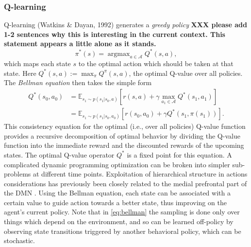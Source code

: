 \documentclass[10pt,letterpaper]{article}
\DeclareMathOperator{\argmax}{argmax}
\begin{document}
\subsubsection{Q-learning} Q-learning (Watkins \& Dayan, 1992) generates a
\textit{greedy policy}
\textbf{XXX please add 1-2 sentences why this is interesting in the current
context. This statement appears a little alone as it stands.}
\begin{equation}
  \pi^*(s) = \argmax_{a \in \mathcal A}{Q}^*(s, a),
  \label{eq:qlearning}
\end{equation}
which maps each state $s$ to the optimal action which should be taken at that state.
Here $Q^*(s, a) := \max_{\pi}Q^\pi(s,a)$, the optimal Q-value over all policies.
The \textit{Bellman equation} \citep{sutton1998reinforcement} then takes the simple form
\begin{equation}
  \begin{split}
    Q^*(s_0, a_0) &= \mathbb E_{s_1 \sim p(s_1|s_0,a)} [r(s,a) + \gamma \max_{a_1 \in \mathcal A}Q^*(s_1, a_1)]
    \\
    &= \mathbb E_{s_1 \sim p(s_1|s_0,a_0)} [r(s_0,a_0) + \gamma Q^*(s_1, \pi(s_1))].
  \end{split}
  \label{eq:bellman}
\end{equation}
This consistency equation for the optimal (i.e., over all policies) Q-value function provides
a recursive decomposition of optimal behavior by dividing the Q-value function into the immediate
reward and the discounted rewards of the upcoming states. The optimal Q-value operator $Q^*$
is a fixed point for this equation. A complicated dynamic programming optimization can be
broken into simpler sub-problems at different time points.
Exploitation of hierarchical structure in actions considerations
has previously been closely related to the medial prefrontal part of the DMN
\citep{koechlin1999role, braver2002role}.
Using the Bellman equation, each state can be associated with a certain value
to guide action towards a better state, thus improving on the agent's current policy.
Note that in \eqref{eq:bellman} the sampling is done only over things which
depend on the environment, and so can be learned off-policy by observing state transitions
triggered by another behavioral policy, which can be stochastic.
\end{document}
